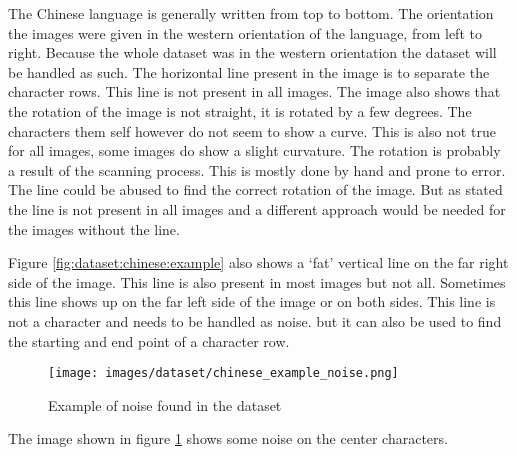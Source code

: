 The Chinese language is generally written from top to bottom. The orientation the images were given in the western orientation of the language, from left to right. Because the whole dataset was in the western orientation the dataset will be handled as such. The horizontal line present in the image is to separate the character rows. This line is not present in all images. The image also shows that the rotation of the image is not straight, it is rotated by a few degrees. The characters them self however do not seem to show a curve. This is also not true for all images, some images do show a slight curvature. The rotation is probably a result of the scanning process. This is mostly done by hand and prone to error. The line could be abused to find the correct rotation of the image. But as stated the line is not present in all images and a different approach would be needed for the images without the line.

Figure \ref{fig:dataset:chinese:example} also shows a `fat' vertical line on the far right side of the image. This line is also present in most images but not all. Sometimes this line shows up on the far left side of the image or on both sides. This line is not a character and needs to be handled as noise. but it can also be used to find the starting and end point of a character row.

\begin{figure}
 \centering
\texttt{[image: images/dataset/chinese\_example\_noise.png]}
 \caption{Example of noise found in the dataset}
 \label{fig:dataset:chinese:example:noise}
\end{figure}


The image shown in figure \ref{fig:dataset:chinese:example:noise} shows some noise on the center characters. 


